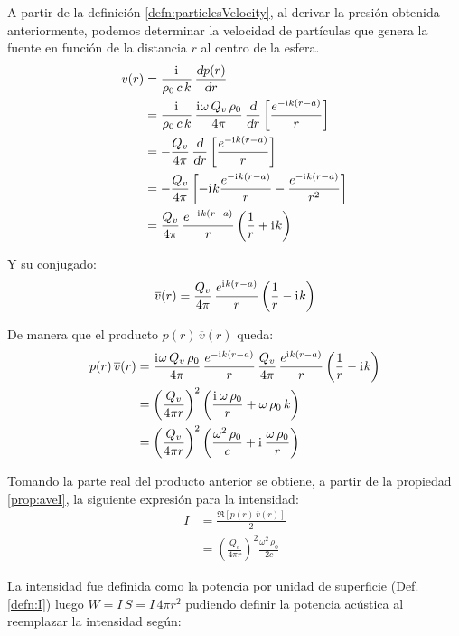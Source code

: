 \documentclass[a5paper,12pt,twoside]{book}
\begin{document}
A partir de la definición \ref{defn:particlesVelocity}, al derivar la presión obtenida anteriormente, podemos determinar la velocidad de partículas que genera la fuente en función de la distancia $r$ al centro de la esfera.
\begin{align*}
    v(r) &= \frac{\mathrm{i}\mkern1mu}{\rho_0 \, c \, k } \, \frac{\textsl{d} p(r)}{\textsl{d} r}
    \\
    &= \frac{\mathrm{i}\mkern1mu}{\rho_0 \, c \, k } \, \frac{\mathrm{i}\mkern1mu \omega \, Q_v \, \rho_0 }{4\pi} \, \frac{\textsl{d}}{\textsl{d} r} \left[ \frac{e^{-\mathrm{i}\mkern1mu k (r-a)}}{r} \right]
    \\
    &= - \frac{Q_v}{4\pi} \, \frac{\textsl{d}}{\textsl{d} r} \left[ \frac{e^{-\mathrm{i}\mkern1mu k (r-a)}}{r} \right]
    \\
    &= - \frac{Q_v}{4\pi} \left[ -\mathrm{i}\mkern1mu k \frac{e^{-\mathrm{i}\mkern1mu k (r-a)}}{r} - \frac{e^{-\mathrm{i}\mkern1mu k (r-a)}}{r^2} \right]
    \\
    &= \frac{Q_v}{4\pi} \, \frac{e^{-\mathrm{i}\mkern1mu k (r-a)}}{r} \left( \frac{1}{r} + \mathrm{i}\mkern1mu k \right)
\end{align*}

Y su conjugado:
\begin{equation*}
    \overline{v}(r) = \frac{Q_v}{4\pi} \, \frac{e^{\mathrm{i}\mkern1mu k (r-a)}}{r} \left( \frac{1}{r} - \mathrm{i}\mkern1mu k \right)
\end{equation*}

De manera que el producto $p(r)\,\overline{v}(r)$ queda:
\begin{align*}
    p(r)\,\overline{v}(r) &= \frac{\mathrm{i}\mkern1mu \omega \, Q_v \, \rho_0 }{4\pi} \, \frac{e^{-\mathrm{i}\mkern1mu k (r-a)}}{r} \, \frac{Q_v}{4\pi} \, \frac{e^{\mathrm{i}\mkern1mu k (r-a)}}{r} \left( \frac{1}{r} - \mathrm{i}\mkern1mu k \right)
    \\
    &= \left(\frac{Q_v}{4\pi r}\right)^2 \left( \frac{\mathrm{i}\mkern1mu \, \omega \, \rho_0}{r} + \omega \, \rho_0 \, k \right)
    \\
    &= \left(\frac{Q_v}{4\pi r}\right)^2 \left( \frac{\omega^2 \, \rho_0}{c} + \mathrm{i}\mkern1mu \, \frac{\omega \, \rho_0}{r} \right)
\end{align*}

Tomando la parte real del producto anterior se obtiene, a partir de la propiedad \ref{prop:aveI}, la siguiente expresión para la intensidad:
\begin{align*}
    I &= \frac{\Re \left[ p(r)\,\overline{v}(r) \right]}{2}
    \\
    &= \left(\frac{Q_v}{4\pi r}\right)^2 \frac{\omega^2 \, \rho_0}{2c}
\end{align*}

La intensidad fue definida como la potencia por unidad de superficie (Def. \ref{defn:I}) luego $W=I\,S=I\,4\pi r^2$ pudiendo definir la potencia acústica al reemplazar la intensidad según:
\end{document}
